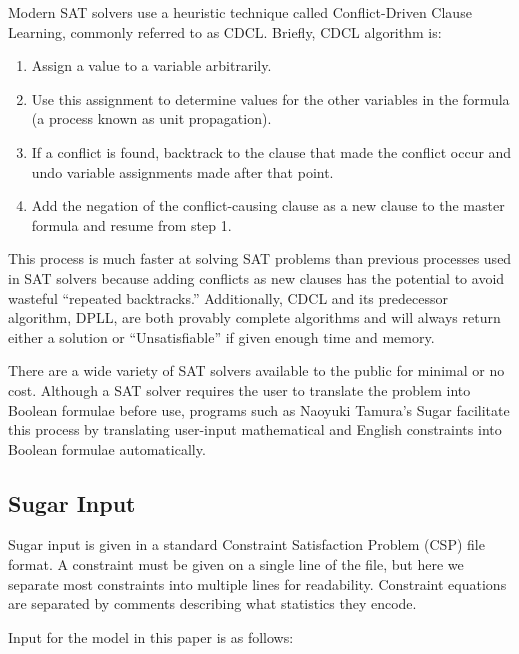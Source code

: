 \documentclass[runningheads]{llncs}
\begin{document}
Modern SAT solvers use a heuristic technique called Conflict-Driven
Clause Learning, commonly referred to as CDCL\cite{cdcl}. Briefly, CDCL algorithm
is:

\begin{enumerate}

\item Assign a value to a variable arbitrarily.
\item Use this assignment to determine values for the other variables
  in the formula (a process known as unit propagation).
\item If a conflict is found, backtrack to the clause that made the
  conflict occur and undo variable assignments made after that point.
\item Add the negation of the conflict-causing clause as a new clause
  to the master formula and resume from step 1.

\end{enumerate}

This process is much faster at solving SAT problems than previous
processes used in SAT solvers because adding conflicts as new clauses
has the potential to avoid wasteful ``repeated backtracks.''
Additionally, CDCL and its predecessor algorithm, DPLL, are both
provably complete algorithms and will always return either a solution
or ``Unsatisfiable'' if given enough time and memory.

There are a wide variety of SAT solvers available to the public for
minimal or no cost. Although a SAT solver requires the user to
translate the problem into Boolean formulae before use, programs such
as Naoyuki Tamura's Sugar facilitate this process by translating
user-input mathematical and English constraints into Boolean formulae
automatically.

\subsection{Sugar Input}

Sugar input is given in a standard Constraint Satisfaction Problem
(CSP) file format. A constraint must be given on a single line of the
file, but here we separate most constraints into multiple lines for
readability. Constraint equations are separated by comments describing
what statistics they encode.

Input for the model in this paper is as follows:

\end{document}
